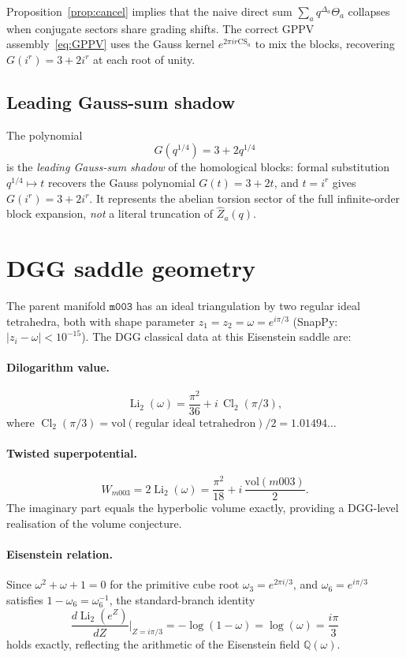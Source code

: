 \documentclass[11pt,a4paper]{article}
\theoremstyle{definition}
\theoremstyle{remark}
\newcommand{\Q}{\mathbb{Q}}
\newcommand{\CS}{\mathrm{CS}}
\newcommand{\mfld}[1]{\texttt{#1}}
\newcommand{\vol}{\mathrm{vol}}
\newcommand{\Li}{\operatorname{Li}}
\newcommand{\Cl}{\operatorname{Cl}}
\begin{document}
Proposition~\ref{prop:cancel} implies that the naive direct sum
$\sum_a q^{\Delta_a}\Theta_a$ collapses when conjugate sectors
share grading shifts. The correct GPPV assembly~\eqref{eq:GPPV}
uses the Gauss kernel $e^{2\pi ir\CS_a}$ to mix the blocks,
recovering $G(i^r)=3+2i^r$ at each root of unity.

\subsection{Leading Gauss-sum shadow}

The polynomial
\begin{equation}
G(q^{1/4}) = 3+2q^{1/4}
\end{equation}
is the \emph{leading Gauss-sum shadow} of the homological blocks:
formal substitution $q^{1/4}\mapsto t$ recovers the Gauss polynomial
$G(t)=3+2t$, and $t=i^r$ gives $G(i^r)=3+2i^r$.
It represents the abelian torsion sector of the full infinite-order
block expansion, \emph{not} a literal truncation of $\hat Z_a(q)$.

\section{DGG saddle geometry}
\label{sec:DGG}

The parent manifold $\mfld{m003}$ has an ideal triangulation by two
regular ideal tetrahedra, both with shape parameter
$z_1=z_2=\omega=e^{i\pi/3}$ (SnapPy: $|z_i-\omega|<10^{-15}$).
The DGG classical data at this Eisenstein saddle are:

\paragraph{Dilogarithm value.}
\begin{equation}\label{eq:li2}
\Li_2(\omega)=\frac{\pi^2}{36}+i\,\Cl_2(\pi/3),
\end{equation}
where $\Cl_2(\pi/3)=\vol(\text{regular ideal tetrahedron})/2
= 1.01494\ldots$

\paragraph{Twisted superpotential.}
\[
W_{m003}=2\Li_2(\omega)=\frac{\pi^2}{18}+i\,\frac{\vol(m003)}{2}.
\]
The imaginary part equals the hyperbolic volume exactly,
providing a DGG-level realisation of the volume conjecture.

\paragraph{Eisenstein relation.}
Since $\omega^2+\omega+1=0$ for the primitive cube root
$\omega_3=e^{2\pi i/3}$, and $\omega_6=e^{i\pi/3}$ satisfies
$1-\omega_6=\omega_6^{-1}$, the standard-branch identity
\begin{equation}\label{eq:Eisenstein}
\frac{d\Li_2(e^Z)}{dZ}\bigg|_{Z=i\pi/3}
=-\log(1-\omega)=\log(\omega)=\frac{i\pi}{3}
\end{equation}
holds exactly, reflecting the arithmetic of the Eisenstein
field $\Q(\omega)$.
\end{document}
